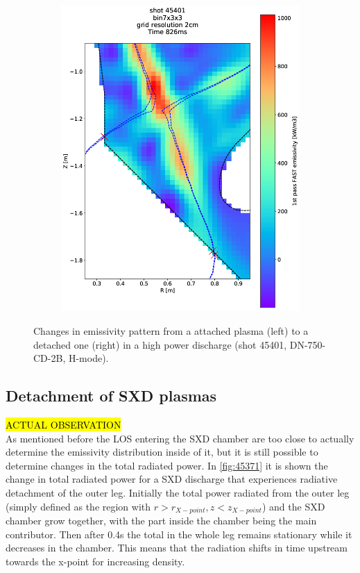 \begin{figure}
\begin{subfigure}{0.21\textwidth}
         \includegraphics[trim={70 0 0 0},clip,width=\textwidth]{Chapters/chapter2/figs/45401_3.png}
         \label{fig:45401_3}
     \end{subfigure}
    \caption{Changes in emissivity pattern from a attached plasma (left) to a detached one (right) in a high power discharge (shot 45401, DN-750-CD-2B, H-mode).}
    \label{fig:45401}
\end{figure}

\subsection{Detachment of SXD plasmas}
\hl{ACTUAL OBSERVATION}\\
As mentioned before the LOS entering the SXD chamber are too close to actually determine the emissivity distribution inside of it, but it is still possible to determine changes in the total radiated power. In \autoref{fig:45371} it is shown the change in total radiated power for a SXD discharge that experiences radiative detachment of the outer leg. Initially the total power radiated from the outer leg (simply defined as the region with $r>r_{X-point}, z<z_{X-point}$) and the SXD chamber grow together, with the part inside the chamber being the main contributor. Then after 0.4s the total in the whole leg remains stationary while it decreases in the chamber. This means that the radiation shifts in time upstream towards the x-point for increasing density.

